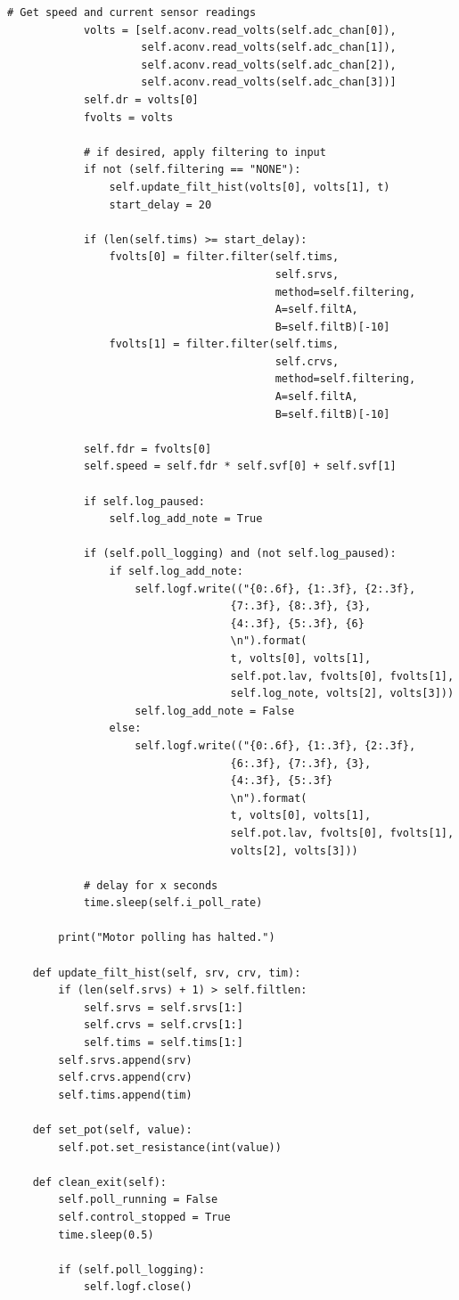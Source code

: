 \documentclass[twoside,a4]{report}
\begin{document}
\begin{Verbatim}[frame=single,fontsize=\footnotesize]
			# Get speed and current sensor readings
			volts = [self.aconv.read_volts(self.adc_chan[0]), 
			         self.aconv.read_volts(self.adc_chan[1]), 
			         self.aconv.read_volts(self.adc_chan[2]), 
			         self.aconv.read_volts(self.adc_chan[3])]
			self.dr = volts[0]
			fvolts = volts
			
			# if desired, apply filtering to input
			if not (self.filtering == "NONE"):
				self.update_filt_hist(volts[0], volts[1], t)
				start_delay = 20
			
			if (len(self.tims) >= start_delay):
				fvolts[0] = filter.filter(self.tims, 
				                          self.srvs, 
				                          method=self.filtering, 
				                          A=self.filtA, 
				                          B=self.filtB)[-10]
				fvolts[1] = filter.filter(self.tims, 
				                          self.crvs, 
				                          method=self.filtering, 
				                          A=self.filtA, 
				                          B=self.filtB)[-10]
			
			self.fdr = fvolts[0]
			self.speed = self.fdr * self.svf[0] + self.svf[1]
			
			if self.log_paused:
				self.log_add_note = True
			
			if (self.poll_logging) and (not self.log_paused):
				if self.log_add_note:
					self.logf.write(("{0:.6f}, {1:.3f}, {2:.3f}, 
					               {7:.3f}, {8:.3f}, {3}, 
					               {4:.3f}, {5:.3f}, {6} 
					               \n").format(
					               t, volts[0], volts[1], 
					               self.pot.lav, fvolts[0], fvolts[1], 
					               self.log_note, volts[2], volts[3]))
					self.log_add_note = False
				else:
					self.logf.write(("{0:.6f}, {1:.3f}, {2:.3f}, 
					               {6:.3f}, {7:.3f}, {3}, 
					               {4:.3f}, {5:.3f} 
					               \n").format(
					               t, volts[0], volts[1], 
					               self.pot.lav, fvolts[0], fvolts[1], 
					               volts[2], volts[3]))
			
			# delay for x seconds
			time.sleep(self.i_poll_rate)
		
		print("Motor polling has halted.")
	
	def update_filt_hist(self, srv, crv, tim):
		if (len(self.srvs) + 1) > self.filtlen:
			self.srvs = self.srvs[1:]
			self.crvs = self.crvs[1:]
			self.tims = self.tims[1:]
		self.srvs.append(srv)
		self.crvs.append(crv)
		self.tims.append(tim)
	
	def set_pot(self, value):
		self.pot.set_resistance(int(value))
	
	def clean_exit(self):
		self.poll_running = False
		self.control_stopped = True
		time.sleep(0.5)
		
		if (self.poll_logging):
			self.logf.close()
\end{Verbatim}
\end{document}
